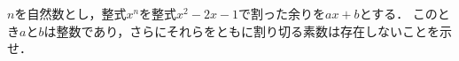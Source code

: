 \documentclass[../../main.tex]{subfiles}
\begin{document}
$n$を自然数とし，整式$x^n$を整式$x^2-2x-1$で割った余りを$ax+b$とする．
このとき$a$と$b$は整数であり，さらにそれらをともに割り切る素数は存在しないことを示せ．
\end{document}
